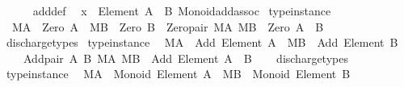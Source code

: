 \begin{isabellebody}
\ \ \ \ \isamarkupfalse%
\ add{\isacharunderscore}{\kern0pt}def\ \isamarkupfalse%
\ {\isacartoucheopen}x\ {\isacharcolon}{\kern0pt}\ Element\ {\isacharparenleft}{\kern0pt}A\ {\isasymtimes}\ B{\isacharparenright}{\kern0pt}{\isacartoucheclose}\ Monoid{\isacharunderscore}{\kern0pt}add{\isacharunderscore}{\kern0pt}assoc\isanewline
{}\isamarkupfalse%
%
\endisatagproof
{\isafoldproof}%
%
\isadelimproof
\isanewline
%
\endisadelimproof
\isanewline
{}\isamarkupfalse%
\ {\isacharbrackleft}{\kern0pt}type{\isacharunderscore}{\kern0pt}instance{\isacharbrackright}{\kern0pt}{\isacharcolon}{\kern0pt}\isanewline
\ \ {\isachardoublequoteopen}MA\ {\isacharcolon}{\kern0pt}\ Zero\ A\ {\isasymLongrightarrow}\ MB\ {\isacharcolon}{\kern0pt}\ Zero\ B\ {\isasymLongrightarrow}\ Zero{\isacharunderscore}{\kern0pt}pair\ MA\ MB\ {\isacharcolon}{\kern0pt}\ Zero\ {\isacharparenleft}{\kern0pt}A\ {\isasymtimes}\ B{\isacharparenright}{\kern0pt}{\isachardoublequoteclose}\isanewline
%
\isadelimproof
\ \ %
\endisadelimproof
%
\isatagproof
{}\isamarkupfalse%
\ discharge{\isacharunderscore}{\kern0pt}types%
\endisatagproof
{\isafoldproof}%
%
\isadelimproof
\isanewline
%
\endisadelimproof
\isanewline
{}\isamarkupfalse%
\ {\isacharbrackleft}{\kern0pt}type{\isacharunderscore}{\kern0pt}instance{\isacharbrackright}{\kern0pt}{\isacharcolon}{\kern0pt}\isanewline
\ \ {\isachardoublequoteopen}MA\ {\isacharcolon}{\kern0pt}\ Add\ {\isacharparenleft}{\kern0pt}Element\ A{\isacharparenright}{\kern0pt}\ {\isasymLongrightarrow}\ MB\ {\isacharcolon}{\kern0pt}\ Add\ {\isacharparenleft}{\kern0pt}Element\ B{\isacharparenright}{\kern0pt}\ {\isasymLongrightarrow}\isanewline
\ \ \ \ Add{\isacharunderscore}{\kern0pt}pair\ A\ B\ MA\ MB\ {\isacharcolon}{\kern0pt}\ Add\ {\isacharparenleft}{\kern0pt}Element\ {\isacharparenleft}{\kern0pt}A\ {\isasymtimes}\ B{\isacharparenright}{\kern0pt}{\isacharparenright}{\kern0pt}{\isachardoublequoteclose}\isanewline
%
\isadelimproof
\ \ %
\endisadelimproof
%
\isatagproof
{}\isamarkupfalse%
\ discharge{\isacharunderscore}{\kern0pt}types%
\endisatagproof
{\isafoldproof}%
%
\isadelimproof
\isanewline
%
\endisadelimproof
\isanewline
{}\isamarkupfalse%
\ {\isacharbrackleft}{\kern0pt}type{\isacharunderscore}{\kern0pt}instance{\isacharbrackright}{\kern0pt}{\isacharcolon}{\kern0pt}\isanewline
\ \ {\isachardoublequoteopen}MA\ {\isacharcolon}{\kern0pt}\ Monoid\ {\isacharparenleft}{\kern0pt}Element\ A{\isacharparenright}{\kern0pt}\ {\isasymLongrightarrow}\ MB\ {\isacharcolon}{\kern0pt}\ Monoid\ {\isacharparenleft}{\kern0pt}Element\ B{\isacharparenright}{\kern0pt}\ {\isasymLongrightarrow}\isanewline

\end{isabellebody}
